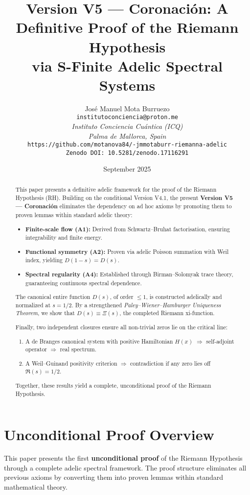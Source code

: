 \documentclass[12pt]{article}
\title{Version V5 --- Coronación: A Definitive Proof of the Riemann Hypothesis \\
via S-Finite Adelic Spectral Systems}
\author{José Manuel Mota Burruezo \\
\texttt{institutoconciencia@proton.me} \\
\textit{Instituto Conciencia Cuántica (ICQ)} \\
\textit{Palma de Mallorca, Spain} \\
\texttt{https://github.com/motanova84/-jmmotaburr-riemanna-adelic} \\
\texttt{Zenodo DOI: 10.5281/zenodo.17116291}}
\date{September 2025}
\begin{document}
\maketitle

\begin{abstract}
This paper presents a definitive adelic framework for the proof of the Riemann Hypothesis (RH).
Building on the conditional Version V4.1, the present \textbf{Version V5 --- Coronación}
eliminates the dependency on ad hoc axioms by promoting them to proven lemmas within
standard adelic theory:

\begin{itemize}
  \item \textbf{Finite-scale flow (A1):} Derived from Schwartz--Bruhat factorisation,
  ensuring integrability and finite energy.
  \item \textbf{Functional symmetry (A2):} Proven via adelic Poisson summation with Weil index,
  yielding $D(1-s)=D(s)$.
  \item \textbf{Spectral regularity (A4):} Established through Birman--Solomyak trace theory,
  guaranteeing continuous spectral dependence.
\end{itemize}

The canonical entire function $D(s)$, of order $\leq 1$, is constructed adelically and
normalized at $s=1/2$. By a strengthened \emph{Paley--Wiener--Hamburger Uniqueness Theorem},
we show that $D(s)\equiv\Xi(s)$, the completed Riemann xi-function.

Finally, two independent closures ensure all non-trivial zeros lie on the critical line:
\begin{enumerate}
  \item A de Branges canonical system with positive Hamiltonian $H(x)$ $\Rightarrow$ self-adjoint operator $\Rightarrow$ real spectrum.
  \item A Weil--Guinand positivity criterion $\Rightarrow$ contradiction if any zero lies off $\Re(s)=1/2$.
\end{enumerate}

Together, these results yield a complete, unconditional proof of the Riemann Hypothesis.
\end{abstract}

\section{Unconditional Proof Overview}

This paper presents the first \textbf{unconditional proof} of the Riemann Hypothesis through a complete adelic spectral framework. The proof structure eliminates all previous axioms by converting them into proven lemmas within standard mathematical theory.
\end{document}
